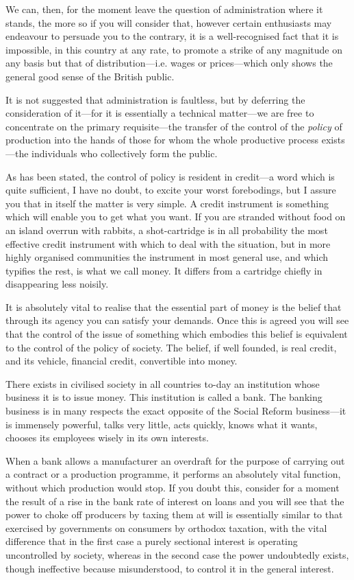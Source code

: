 \documentclass{book}
\begin{document}
We can, then, for the moment leave the question of administration where it stands, the more so if you will consider that, however certain enthusiasts may endeavour to persuade you to the contrary, it is a well-recognised fact that it is impossible, in this country at any rate, to promote a strike of any magnitude on any basis but that of distribution—i.e. wages or prices—which only shows the general good sense of the British public.

It is not suggested that administration is faultless, but by deferring the consideration of it—for it is essentially a technical matter—we are free to concentrate on the primary requisite—the transfer of the control of the \emph{policy} of production into the hands of those for whom the whole productive process exists—the individuals who collectively form the public.

As has been stated, the control of policy is resident in credit—a word which is quite sufficient, I have no doubt, to excite your worst forebodings, but I assure you that in itself the matter is very simple. A credit instrument is something which will enable you to get what you want. If you are stranded without food on an island overrun with rabbits, a shot-cartridge is in all probability the most effective credit instrument with which to deal with the situation, but in more highly organised communities the instrument in most general use, and which typifies the rest, is what we call money. It differs from a cartridge chiefly in disappearing less noisily.

It is absolutely vital to realise that the essential part of money is the belief that through its agency you can satisfy your demands. Once this is agreed you will see that the control of the issue of something which embodies this belief is equivalent to the control of the policy of society. The belief, if well founded, is real credit, and its vehicle, financial credit, convertible into money.

There exists in civilised society in all countries to-day an institution whose business it is to issue money. This institution is called a bank. The banking business is in many respects the exact opposite of the Social Reform business—it is immensely powerful, talks very little, acts quickly, knows what it wants, chooses its employees wisely in its own interests.

When a bank allows a manufacturer an overdraft for the purpose of carrying out a contract or a production programme, it performs an absolutely vital function, without which production would stop. If you doubt this, consider for a moment the result of a rise in the bank rate of interest on loans and you will see that the power to choke off producers by taxing them at will is essentially similar to that exercised by governments on consumers by orthodox taxation, with the vital difference that in the first case a purely sectional interest is operating uncontrolled by society, whereas in the second case the power undoubtedly exists, though ineffective because misunderstood, to control it in the general interest.
\end{document}
